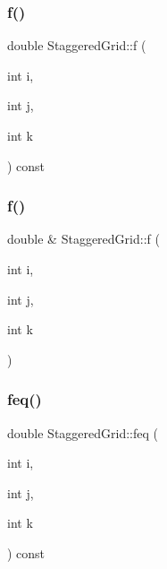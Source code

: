 \mbox{\label{classStaggeredGrid_a2a9f3c3dc78482fc452920b5bbb2792e}} 
\subsubsection{\texorpdfstring{f()}{f()}\hspace{0.1cm}{\footnotesize\ttfamily [1/2]}}
{\footnotesize\ttfamily double Staggered\+Grid\+::f (\begin{DoxyParamCaption}\item[{int}]{i,  }\item[{int}]{j,  }\item[{int}]{k }\end{DoxyParamCaption}) const}

\mbox{\label{classStaggeredGrid_ad4ac0ad1aa8623609c4843c2ae10c37c}} 
\subsubsection{\texorpdfstring{f()}{f()}\hspace{0.1cm}{\footnotesize\ttfamily [2/2]}}
{\footnotesize\ttfamily double \& Staggered\+Grid\+::f (\begin{DoxyParamCaption}\item[{int}]{i,  }\item[{int}]{j,  }\item[{int}]{k }\end{DoxyParamCaption})}

\mbox{\label{classStaggeredGrid_ac2473c046774f2e69a876187b574880a}} 
\subsubsection{\texorpdfstring{feq()}{feq()}\hspace{0.1cm}{\footnotesize\ttfamily [1/2]}}
{\footnotesize\ttfamily double Staggered\+Grid\+::feq (\begin{DoxyParamCaption}\item[{int}]{i,  }\item[{int}]{j,  }\item[{int}]{k }\end{DoxyParamCaption}) const}

